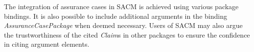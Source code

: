 The integration of assurance cases in SACM is achieved using various package bindings. It is also possible to include additional arguments in the binding \textit{AssuranceCasePackage} when deemed necessary. Users of SACM may also argue the trustworthiness of the cited \textit{Claim}s in other packages to ensure the confidence in citing argument elements. 